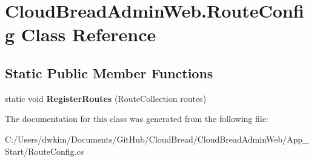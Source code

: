 \hypertarget{a00175}{}\section{Cloud\+Bread\+Admin\+Web.\+Route\+Config Class Reference}
\label{a00175}
\subsection*{Static Public Member Functions}
\begin{DoxyCompactItemize}
\item 
static void {\bfseries Register\+Routes} (Route\+Collection routes)\hypertarget{a00175_ae7523a12bc762c0517c47f2e0cbd9f65}{}\label{a00175_ae7523a12bc762c0517c47f2e0cbd9f65}

\end{DoxyCompactItemize}


The documentation for this class was generated from the following file\+:\begin{DoxyCompactItemize}
\item 
C\+:/\+Users/dwkim/\+Documents/\+Git\+Hub/\+Cloud\+Bread/\+Cloud\+Bread\+Admin\+Web/\+App\+\_\+\+Start/Route\+Config.\+cs\end{DoxyCompactItemize}
